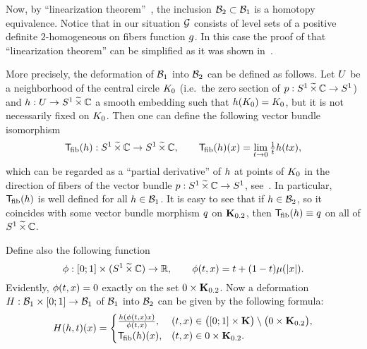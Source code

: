 \begin{enumerate}[wide, label={\rm\arabic*)}, topsep=1ex, itemsep=1ex]
Now, by ``linearization theorem''~\cite{KhokhliukMaksymenko:fol_nbh:2022}, the inclusion $\mathcal{B}_{ 2 } \subset \mathcal{B}_{ 1 }$ is a homotopy equivalence.
Notice that in our situation $\mathcal{G}$ consists of level sets of a positive definite $2$-homogeneous on fibers function $g$.
In this case the proof of that ``linearization theorem'' can be simplified as it was shown in~\cite[Theorem~3.1.2]{KhokhliukMaksymenko:lens:2022}.

More precisely, the deformation of $\mathcal{B}_{ 1 }$ into $\mathcal{B}_{ 2 }$ can be defined as follows.
Let $U$ be a neighborhood of the central circle $K_{0}$ (i.e.\ the zero section of ${p}:S^1\,\widetilde{\times}\,\mathbb{C}\to S^1$) and $h:U\to S^1\,\widetilde{\times}\,\mathbb{C}$ a smooth embedding such that $h(K_{0}) = K_{0}$, but it is not necessarily fixed on $K_{0}$.
Then one can define the following vector bundle isomorphism
\[
\mathsf{T}_{\!\mathrm{fib}}(h):S^1\,\widetilde{\times}\,\mathbb{C}\to S^1\,\widetilde{\times}\,\mathbb{C},
\qquad
\mathsf{T}_{\!\mathrm{fib}}(h)(x) = \lim\limits_{t\to0}\tfrac{1}{t} h(tx),
\]
which can be regarded as a ``partial derivative'' of $h$ at points of $K_{0}$ in the direction of fibers of the vector bundle ${p}:S^1\,\widetilde{\times}\,\mathbb{C}\to S^1$, see~\cite{KhokhliukMaksymenko:fol_nbh:2022}.
In particular, $\mathsf{T}_{\!\mathrm{fib}}(h)$ is well defined for all $h\in\mathcal{B}_{ 1 }$.
It is easy to see that if $h\in\mathcal{B}_{ 2 }$, so it coincides with some vector bundle morphism $q$ on $\mathbf{K}_{0.2}$, then $\mathsf{T}_{\!\mathrm{fib}}(h) \equiv q$ on all of $S^1\,\widetilde{\times}\,\mathbb{C}$.

Define also the following function
\[
    \phi:[0;1]\times(S^1\,\widetilde{\times}\,\mathbb{C})\to\mathbb{R},
    \qquad
    \phi(t,x) = t + (1-t)\mu(\vert x\vert).
\]
Evidently, $\phi(t,x)=0$ exactly on the set $0\times\mathbf{K}_{0.2}$.
Now a deformation $H:\mathcal{B}_{ 1 }\times[0;1]\to\mathcal{B}_{ 1 }$ of $\mathcal{B}_{ 1 }$ into $\mathcal{B}_{ 2 }$ can be given by the following formula:
\[
H(h,t)(x) =
\begin{cases}
\frac{h(\phi(t,x)x)}{\phi(t,x)}, &  (t,x)\in\bigl([0;1]\times\mathbf{K}\bigr) \setminus \bigl(0\times\mathbf{K}_{0.2}\bigr), \\
\mathsf{T}_{\!\mathrm{fib}}(h)(x), & (t,x)\in0\times\mathbf{K}_{0.2}.
\end{cases}
\]


\end{enumerate}
